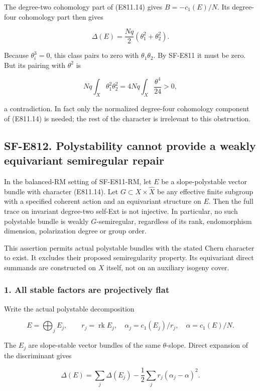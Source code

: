 The degree-two cohomology part of (E811.14) gives \(B=-c_1(E)/N\). Its
degree-four cohomology part then gives

\[
 \Delta(E)=\frac{Nq}{2}(\theta_1^2+\theta_2^2).
 \tag{E811.15}
\]

Because \(\theta_i^3=0\), this class pairs to zero with
\(\theta_1\theta_2\). By SF-E811 it must be zero. But its pairing with
\(\theta^2\) is

\[
 Nq\int_X\theta_1^2\theta_2^2
       =4Nq\int_X\frac{\theta^4}{24}>0,
\]

a contradiction. In fact only the normalized degree-four cohomology
component of (E811.14) is needed; the rest of the character is
irrelevant to this obstruction.

\subsection{SF-E812. Polystability cannot provide a weakly equivariant
semiregular
repair}\label{SF-E812}

In the balanced-RM setting of SF-E811-RM, let \(E\) be a
slope-polystable vector bundle with character (E811.14). Let
\(G\subset X\times\widehat X\) be any effective finite subgroup with a
specified coherent action and an equivariant structure on \(E\). Then
the full trace on invariant degree-two self-Ext is not injective. In
particular, no such polystable bundle is weakly \(G\)-semiregular,
regardless of its rank, endomorphism dimension, polarization degree or
group order.

This assertion permits actual polystable bundles with the stated Chern
character to exist. It excludes their proposed semiregularity property.
Its equivariant direct summands are constructed on \(X\) itself, not on
an auxiliary isogeny cover.

\subsubsection{1. All stable factors are projectively
flat}\label{all-stable-factors-are-projectively-flat}

Write the actual polystable decomposition

\[
 E=\bigoplus_j E_j,\qquad
 r_j=\operatorname{rk}E_j,\quad
 \alpha_j=c_1(E_j)/r_j,\quad
 \alpha=c_1(E)/N.
\]

The \(E_j\) are slope-stable vector bundles of the same
\(\theta\)-slope. Direct expansion of the discriminant gives

\[
 \Delta(E)=\sum_j\Delta(E_j)
       -\frac12\sum_j r_j(\alpha_j-\alpha)^2.
 \tag{E812.1}
\]

